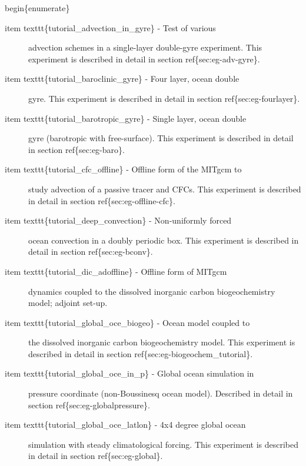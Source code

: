 \documentclass[letterpaper,10pt,english]{sphinxmanual}
\begin{document}
begin\{enumerate\}
\begin{description}
\item[{item texttt\{tutorial\_advection\_in\_gyre\} - Test of various}] \leavevmode
advection schemes in a single-layer double-gyre experiment.
This experiment is described in detail in section
ref\{sec:eg-adv-gyre\}.

\item[{item texttt\{tutorial\_baroclinic\_gyre\} - Four layer, ocean double}] \leavevmode
gyre. This experiment is described in detail in section
ref\{sec:eg-fourlayer\}.

\item[{item texttt\{tutorial\_barotropic\_gyre\} - Single layer, ocean double}] \leavevmode
gyre (barotropic with free-surface).
This experiment is described in detail in section ref\{sec:eg-baro\}.

\item[{item texttt\{tutorial\_cfc\_offline\} - Offline form of the MITgcm to}] \leavevmode
study advection of a passive tracer and CFCs.
This experiment is described in detail in section ref\{sec:eg-offline-cfc\}.

\item[{item texttt\{tutorial\_deep\_convection\} - Non-uniformly forced}] \leavevmode
ocean convection in a doubly periodic box. This experiment is
described in detail in section ref\{sec:eg-bconv\}.

\item[{item texttt\{tutorial\_dic\_adoffline\} - Offline form of MITgcm}] \leavevmode
dynamics coupled to the dissolved inorganic carbon biogeochemistry model;
adjoint set-up.

\item[{item texttt\{tutorial\_global\_oce\_biogeo\} - Ocean model coupled to}] \leavevmode
the dissolved inorganic carbon biogeochemistry model. This
experiment is described in detail in section
ref\{sec:eg-biogeochem\_tutorial\}.

\item[{item texttt\{tutorial\_global\_oce\_in\_p\} - Global ocean simulation in}] \leavevmode
pressure coordinate (non-Boussinesq ocean model). Described in
detail in section ref\{sec:eg-globalpressure\}.

\item[{item texttt\{tutorial\_global\_oce\_latlon\} - 4x4 degree global ocean}] \leavevmode
simulation with steady climatological forcing. This experiment is
described in detail in section ref\{sec:eg-global\}.


\end{description}
\end{document}
